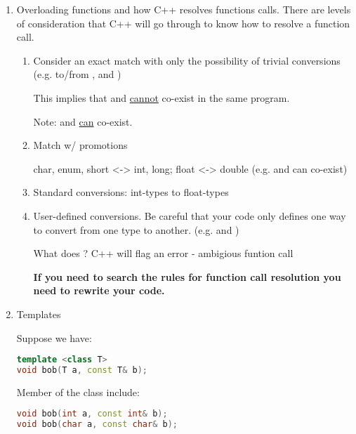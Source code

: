 \begin{enumerate}
  \item Overloading functions and how C++ resolves functions calls.
There are levels of consideration that C++ will go through to know how to resolve a function call.
  \begin{enumerate}
    \item Consider an exact match with only the possibility of trivial conversions (e.g.  to/from ,  and )

    This implies that  and  \underline{cannot} co-exist in the same program.
    
    Note:  and  \underline{can} co-exist.

    \item Match w/ promotions

    char, enum, short <-> int, long; float <-> double (e.g.  and  can co-exist)

    \item Standard conversions: int-types to float-types

    \item User-defined conversions. Be careful that your code only defines one way to convert from one type to another. (e.g.  and )

    What does ? C++ will flag an error - ambigious funtion call

    \textbf{If you need to search the rules for function call resolution you need to rewrite your code.}
  \end{enumerate}

  \item Templates

  Suppose we have:

  \begin{lstlisting}[language=C++]
template <class T>
void bob(T a, const T& b);
  \end{lstlisting}

  Member of the class include:
  
  \begin{lstlisting}[language=C++]
void bob(int a, const int& b);
void bob(char a, const char& b);
  \end{lstlisting}

\end{enumerate}

